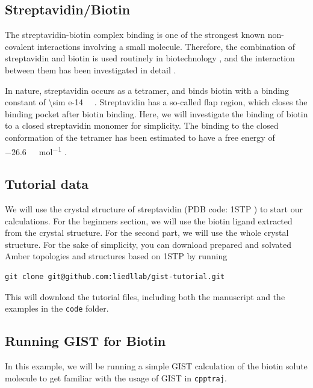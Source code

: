 \documentclass[9pt,tutorial]{livecoms}
\newcommand{\software}{\texttt}
\newcommand\inlinecode{\texttt}
\begin{document}
\subsection{Streptavidin/Biotin}
The streptavidin-biotin complex binding is one of the strongest known non-covalent interactions involving a small molecule.
Therefore, the combination of streptavidin and biotin is used routinely in biotechnology \cite{Dundas2013-streptavidin-review}, and the interaction between them has been investigated in detail \cite{McConnell2021-biotin}.

\newcommand{\appr}{{\mathord{\sim}}}
In nature, streptavidin occurs as a tetramer, and binds biotin with a binding constant of \SI{\sim e-14}{\per\Molar} \cite{Dundas2013-streptavidin-review}.
Streptavidin has a so-called flap region, which closes the binding pocket after biotin binding.
Here, we will investigate the binding of biotin to a closed streptavidin monomer for simplicity.
The binding to the closed conformation of the tetramer has been estimated to have a free energy of \SI{-26.6}{\kilo\calorie\per\mol} \cite{Bansal2018-biotin}.

\subsection{Tutorial data}
We will use the crystal structure of streptavidin (PDB code: 1STP \cite{Weber1989-streptavidin-structure}) to start our calculations.
For the beginners section, we will use the biotin ligand extracted from the crystal structure.
For the second part, we will use the whole crystal structure.
For the sake of simplicity, you can download prepared and solvated Amber topologies and structures based on 1STP by running
\begin{lstlisting}[style=bash]
git clone git@github.com:liedllab/gist-tutorial.git
\end{lstlisting}
This will download the tutorial files, including both the manuscript and the examples in the \inlinecode{code} folder.

\subsection{Running GIST for Biotin}
In this example, we will be running a simple GIST calculation of the biotin solute molecule to get familiar with the usage of GIST in \software{cpptraj}.
\end{document}
